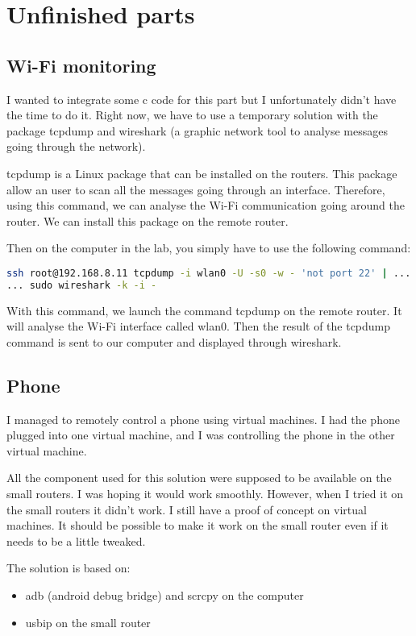 \chapter{Unfinished parts}


\section{Wi-Fi monitoring}

I wanted to integrate some c code for this part but I unfortunately didn't have the time to do it. Right now, we have to use a temporary solution with the package tcpdump and wireshark (a graphic network tool to analyse messages going through the network).

tcpdump is a Linux package that can be installed on the routers. This package allow an user to scan all the messages going through an interface. Therefore, using this command, we can analyse the Wi-Fi communication going around the router.
We can install this package on the remote router.

Then on the computer in the lab, you simply have to use the following command:

\begin{lstlisting}[language=bash]
ssh root@192.168.8.11 tcpdump -i wlan0 -U -s0 -w - 'not port 22' | ... 
... sudo wireshark -k -i -
\end{lstlisting}

With this command, we launch the command tcpdump on the remote router. It will analyse the Wi-Fi interface called wlan0. Then the result of the tcpdump command is sent to our computer and displayed through wireshark. 



\section{Phone}


I managed to remotely control a phone using virtual machines. I had the phone plugged into one virtual machine, and I was controlling the phone in the other virtual machine.

All the component used for this solution were supposed to be available on the small routers. I was hoping it would work smoothly. However, when I tried it on the small routers it didn't work. I still have a proof of concept on virtual machines. It should be possible to make it work on the small router even if it needs to be a little tweaked.

The solution is based on:
\begin{itemize}
	\item adb (android debug bridge) and scrcpy on the computer
	\item usbip on the small router
\end{itemize}

